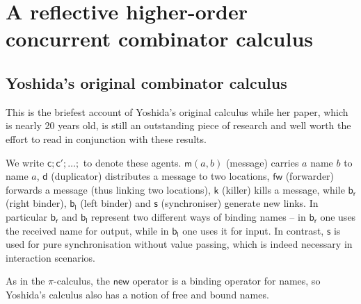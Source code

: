 \documentclass{llncs}
\newcommand{\new}{\mathsf{new}}
\newcommand{\pic}{$\pi$-calculus}
\newcommand{\pzero}{\mathbin{0}}
\newcommand{\freenames}[1]{\mathbin{\mathsf{FN}(#1)}}
\newcommand{\bc}{\mathbin{\mathbf{::=}}}
\newcommand{\bm}{\mathbin{\mathbf\mid}}
\begin{document}
\section{A reflective higher-order concurrent combinator calculus}

\subsection{Yoshida's original combinator calculus}

This is the briefest account of Yoshida's original calculus while her
paper, which is nearly 20 years old, is still an outstanding piece of
research and well worth the effort to read in conjunction with these results.


We write $\mathsf{c};\mathsf{c'};\ldots;$ to denote these
agents. $\mathsf{m}(a,b)$ (message) carries $a$ name $b$ to name $a$,
$\mathsf{d}$ (duplicator) distributes a message to two locations,
$\mathsf{fw}$ (forwarder) forwards a message (thus linking two
locations), $\mathsf{k}$ (killer) kills a message, while
$\mathsf{b}_{\mathsf{r}}$ (right binder), $\mathsf{b}_{\mathsf{l}}$
(left binder) and $\mathsf{s}$ (synchroniser) generate new links. In
particular $\mathsf{b}_{\mathsf{r}}$ and $\mathsf{b}_{\mathsf{l}}$
represent two different ways of binding names – in
$\mathsf{b}_{\mathsf{r}}$ one uses the received name for output, while
in $\mathsf{b}_{\mathsf{l}}$ one uses it for input. In contrast,
$\mathsf{s}$ is used for pure synchronisation without value passing,
which is indeed necessary in interaction scenarios.

As in the {\pic}, the $\new$ operator is a binding operator
for names, so Yoshida's calculus also has a notion of free and bound names.

\end{document}

